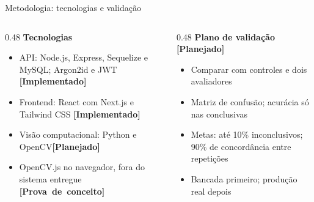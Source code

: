 \documentclass[aspectratio=169]{beamer}
\newcommand{\estado}[2]{\mbox{\scriptsize\textcolor{#1}{\textbf{[#2]}}}}
\newcommand{\implementado}{\estado{azulComplementar}{Implementado}}
\newcommand{\provaconceito}{\estado{vermelhoPrincipal}{Prova de conceito}}
\newcommand{\planejado}{\estado{black!70}{Planejado}}
\begin{document}
\begin{frame}[t]{Metodologia: tecnologias e validação}
  \begin{columns}[T]
    \begin{column}{0.48\textwidth}
      \textbf{Tecnologias}
      \begin{itemize}
        \item API: Node.js, Express, Sequelize e MySQL; Argon2id e JWT \implementado
        \item Frontend: React com Next.js e Tailwind CSS \implementado
        \item Visão computacional: Python e OpenCV\footnotemark[1] \planejado
        \item OpenCV.js no navegador, fora do sistema entregue \provaconceito
      \end{itemize}
    \end{column}
    \begin{column}{0.48\textwidth}
      \textbf{Plano de validação} \planejado
      \begin{itemize}
        \item Comparar com controles e dois avaliadores
        \item Matriz de confusão; acurácia só nas conclusivas
        \item Metas: até 10\% inconclusivos; 90\% de concordância entre repetições\footnotemark[2]
        \item Bancada primeiro; produção real depois
      \end{itemize}
    \end{column}
  \end{columns}
\end{frame}

\end{document}
